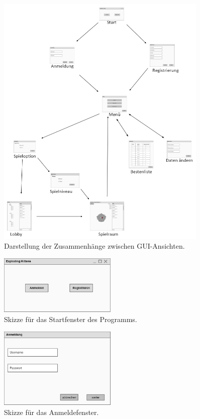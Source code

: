 \begin{figure}
	\centering
	\includegraphics[width=0.9\textwidth]{img/Graph}
	\caption{Darstellung der Zusammenhänge zwischen GUI-Ansichten.}
	\label{gui:zusammenhang}
\end{figure}

\begin{figure}
	\centering
	\includegraphics[width=0.5\textwidth]{img/Launch}
	\caption{Skizze für das Startfenster des Programms.}
	\label{gui:start}
\end{figure}

\begin{figure}
	\centering
	\includegraphics[width=0.5\textwidth]{img/Anmelden}
	\caption{Skizze für das Anmeldefenster.}
	\label{gui:login}
\end{figure}

